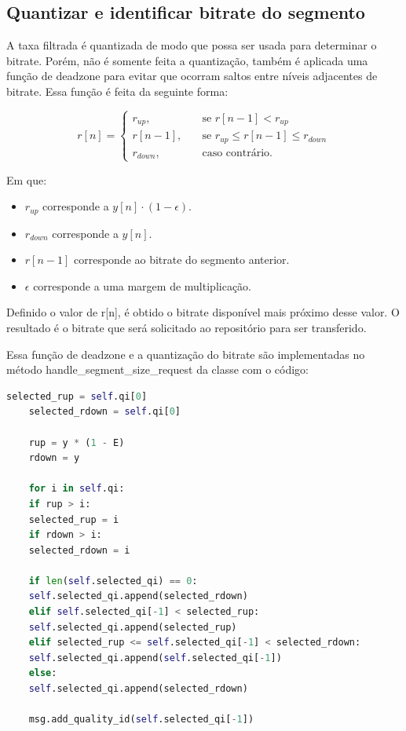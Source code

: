 \documentclass[10pt,twocolumn,letterpaper]{article}
\begin{document}
\subsection{Quantizar e identificar bitrate do segmento}

A taxa filtrada é quantizada de modo que possa ser usada para determinar o bitrate. Porém, não é somente feita a quantização, também é aplicada uma função de deadzone para evitar que ocorram saltos entre níveis adjacentes de bitrate. Essa função é feita da seguinte forma:

\begin{equation}
	r[n] = 
	\begin{cases}
		r_{up},       & \quad \text{se } r[n-1] < r_{up}\\
		r[n-1],       & \quad \text{se } r_{up} \leq r[n-1] \leq r_{down} \\
		r_{down},       & \quad \text{caso contrário.}
	\end{cases}
\end{equation}

Em que:
\begin{itemize}
	\item $r_{up}$ corresponde a $y[n] \cdot (1 - \epsilon)$.
	\item $r_{down}$ corresponde a $y[n]$.
	\item $r[n-1]$ corresponde ao bitrate do segmento anterior.
	\item $\epsilon$ corresponde a uma margem de multiplicação.
\end{itemize}

Definido o valor de r[n], é obtido o bitrate disponível mais próximo desse valor. O resultado é o bitrate que será solicitado ao repositório para ser transferido.

Essa função de deadzone e a quantização do bitrate são implementadas no método handle\_segment\_size\_request da classe com o código:

\begin{lstlisting}[language=python]
	selected_rup = self.qi[0]
	selected_rdown = self.qi[0]
	
	rup = y * (1 - E)
	rdown = y
	
	for i in self.qi:
	if rup > i:
	selected_rup = i
	if rdown > i:
	selected_rdown = i
	
	if len(self.selected_qi) == 0:
	self.selected_qi.append(selected_rdown)
	elif self.selected_qi[-1] < selected_rup:
	self.selected_qi.append(selected_rup)
	elif selected_rup <= self.selected_qi[-1] < selected_rdown:
	self.selected_qi.append(self.selected_qi[-1])
	else:
	self.selected_qi.append(selected_rdown)
	
	msg.add_quality_id(self.selected_qi[-1])
\end{lstlisting}
\end{document}

